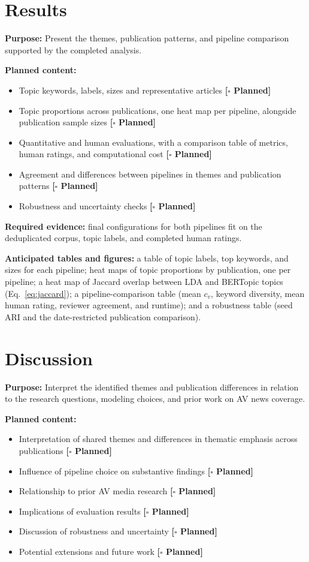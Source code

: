 \documentclass[conference]{IEEEtran}
\newcommand{\planned}{\textcolor{blue!60!black}{\textbf{[$\square$ Planned]}}}
\begin{document}
\section*{Results}
\textbf{Purpose:} Present the themes, publication patterns, and pipeline comparison supported by the completed analysis.

\textbf{Planned content:} 
\begin{itemize}
    \item Topic keywords, labels, sizes and representative articles \planned
    \item Topic proportions across publications, one heat map per pipeline, alongside publication sample sizes \planned
    \item Quantitative and human evaluations, with a comparison table of metrics, human ratings, and computational cost \planned
    \item Agreement and differences between pipelines in themes and publication patterns \planned
    \item Robustness and uncertainty checks \planned
\end{itemize}

\textbf{Required evidence:} final configurations for both pipelines fit on the deduplicated corpus, topic labels, and completed human ratings.

\textbf{Anticipated tables and figures:} a table of topic labels, top keywords, and sizes for each pipeline; heat maps of topic proportions by publication, one per pipeline; a heat map of Jaccard overlap between LDA and BERTopic topics (Eq.~\ref{eq:jaccard}); a pipeline-comparison table (mean $c_v$, keyword diversity, mean human rating, reviewer agreement, and runtime); and a robustness table (seed ARI and the date-restricted publication comparison).


\section*{Discussion}
\textbf{Purpose:} Interpret the identified themes and publication differences in relation to the research questions, modeling choices, and prior work on AV news coverage.

\textbf{Planned content:} 
\begin{itemize}
    \item Interpretation of shared themes and differences in thematic emphasis across publications \planned
    \item Influence of pipeline choice on substantive findings \planned
    \item Relationship to prior AV media research \planned
    \item Implications of evaluation results \planned
    \item Discussion of robustness and uncertainty \planned 
    \item Potential extensions and future work \planned
\end{itemize}
\end{document}
